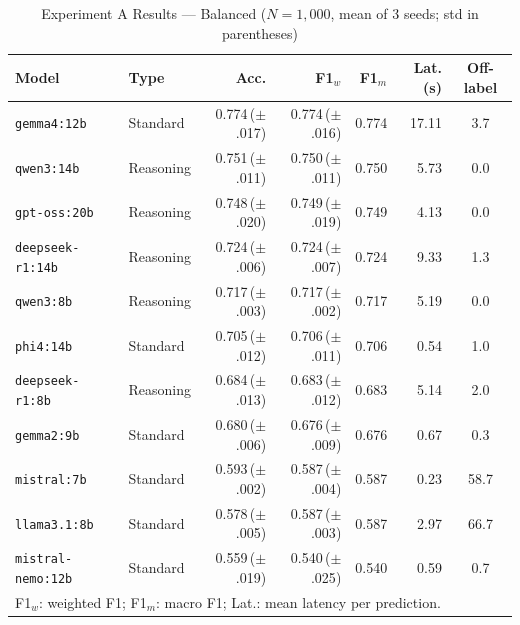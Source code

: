 \documentclass[a4paper,fleqn]{cas-dc}
\begin{document}
\begin{table}[!t]
  \renewcommand{\arraystretch}{1.2}
  \caption{Experiment A Results --- Balanced ($N = 1{,}000$, mean of 3 seeds; std in parentheses)}
  \label{tab:results_balanced}
  \centering
  \scriptsize
  \setlength{\tabcolsep}{4pt}
  \begin{tabular}{@{}llrrrrc@{}}
    \toprule
    \textbf{Model} & \textbf{Type} & \textbf{Acc.} & \textbf{F1$_w$} & \textbf{F1$_m$} & \textbf{Lat.(s)} & \textbf{Off-label} \\
    \midrule
    \texttt{gemma4:12b}       & Standard  & 0.774\,({\footnotesize$\pm$.017}) & 0.774\,({\footnotesize$\pm$.016}) & 0.774 & 17.11 & 3.7 \\
    \texttt{qwen3:14b}        & Reasoning & 0.751\,({\footnotesize$\pm$.011}) & 0.750\,({\footnotesize$\pm$.011}) & 0.750 &  5.73 & 0.0 \\
    \texttt{gpt-oss:20b}      & Reasoning & 0.748\,({\footnotesize$\pm$.020}) & 0.749\,({\footnotesize$\pm$.019}) & 0.749 &  4.13 & 0.0 \\
    \texttt{deepseek-r1:14b}  & Reasoning & 0.724\,({\footnotesize$\pm$.006}) & 0.724\,({\footnotesize$\pm$.007}) & 0.724 &  9.33 & 1.3 \\
    \texttt{qwen3:8b}         & Reasoning & 0.717\,({\footnotesize$\pm$.003}) & 0.717\,({\footnotesize$\pm$.002}) & 0.717 &  5.19 & 0.0 \\
    \texttt{phi4:14b}         & Standard  & 0.705\,({\footnotesize$\pm$.012}) & 0.706\,({\footnotesize$\pm$.011}) & 0.706 &  0.54 & 1.0 \\
    \texttt{deepseek-r1:8b}   & Reasoning & 0.684\,({\footnotesize$\pm$.013}) & 0.683\,({\footnotesize$\pm$.012}) & 0.683 &  5.14 & 2.0 \\
    \texttt{gemma2:9b}        & Standard  & 0.680\,({\footnotesize$\pm$.006}) & 0.676\,({\footnotesize$\pm$.009}) & 0.676 &  0.67 & 0.3 \\
    \texttt{mistral:7b}       & Standard  & 0.593\,({\footnotesize$\pm$.002}) & 0.587\,({\footnotesize$\pm$.004}) & 0.587 &  0.23 & 58.7 \\
    \texttt{llama3.1:8b}      & Standard  & 0.578\,({\footnotesize$\pm$.005}) & 0.587\,({\footnotesize$\pm$.003}) & 0.587 &  2.97 & 66.7 \\
    \texttt{mistral-nemo:12b} & Standard  & 0.559\,({\footnotesize$\pm$.019}) & 0.540\,({\footnotesize$\pm$.025}) & 0.540 &  0.59 & 0.7 \\
    \bottomrule
    \multicolumn{7}{l}{\footnotesize F1$_w$: weighted F1; F1$_m$: macro F1; Lat.: mean latency per prediction.}
  \end{tabular}
\end{table}
\end{document}
